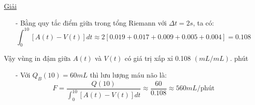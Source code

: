 \documentclass[12pt,a4paper]{article}
\begin{document}
\begin{enumerate}[a/]
	      \centering\underline{Giải}
	      \begin{itemize}
		      \item[-] Bằng quy tắc điểm giữa trong tổng Riemann với $\Delta t=2s$, ta có:
		            $$\int_{0}^{10}\left[A(t)-V(t)\right]dt\approx 2\left[0.019+0.017+0.009+0.005+0.004\right]=0.108$$
	      \end{itemize}
	      \begin{flushleft}
		      Vậy vùng in đậm giữa $A(t)$ và $V(t)$ có giá trị xấp xỉ 0.108 $(mL/mL)$. phút
	      \end{flushleft}
	      \begin{itemize}
		      \item[-] Với $Q_B(10)=60mL$ thì lưu lượng máu não là:
		            $$F=\frac{Q(10)}{\displaystyle \int_{0}^{10}\left[A(t)-V(t)\right]dt} \approx \frac{60}{0.108} \approx 560mL/\text{phút}$$
	      \end{itemize}
\end{enumerate}

\newpage
\end{document}
